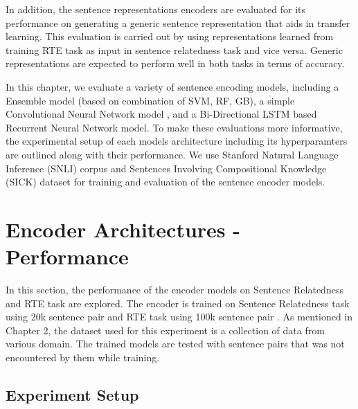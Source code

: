 \documentclass[12pt]{report} %
\begin{document}
 In addition, the sentence representations encoders are evaluated for its performance on generating a generic sentence representation that aids in transfer learning. This evaluation is carried out by using representations learned from training RTE task as input in sentence relatedness task and vice versa. Generic representations are expected to perform well in both tasks in terms of accuracy.  
 
 In this chapter, we evaluate a variety of sentence encoding models,
 including a Ensemble model (based on combination of SVM, RF, GB), a simple Convolutional Neural Network model , and a Bi-Directional LSTM based Recurrent Neural Network model. To make these evaluations more informative, the experimental setup of each models architecture including its hyperparamters are outlined along with their performance. We use Stanford Natural Language Inference (SNLI) corpus and Sentences Involving Compositional Knowledge (SICK) dataset for training and evaluation of the sentence encoder models. 
 
 
 


\section{Encoder Architectures - Performance}
In this section, the performance of the encoder models on Sentence Relatedness and RTE task are explored. The encoder is trained on Sentence Relatedness task using 20k sentence pair \cite{cer2017semeval} and RTE task using 100k sentence pair \cite{bowman2015large}. As mentioned in Chapter 2, the dataset used for this experiment is a collection of data from various domain. The trained models are tested with sentence pairs that was not encountered by them while training. 

\subsection{Experiment Setup}
\end{document}
